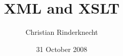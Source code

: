 \documentclass[compress,dvips,xcolor={dvipsnames},t]{beamer}
\title{XML and XSLT}
\author{Christian Rinderknecht}
\date{31 October 2008}
\begin{document}
\frame{\maketitle}





\end{document}
